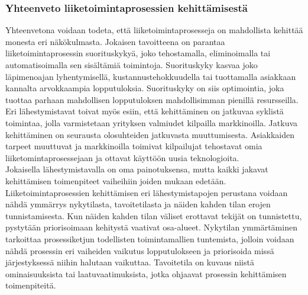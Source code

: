\documentclass[finnish,12pt,a4paper,pdftex]{article}
\begin{document}


\subsubsection{Yhteenveto liiketoimintaprosessien kehittämisestä}


Yhteenvetona voidaan todeta, että liiketoimintaprosesseja on mahdollista kehittää monesta eri näkökulmasta. Jokaisen tavoitteena on parantaa liiketoimintaprosessin suorituskykyä, joko tehostamalla, eliminoimalla tai automatisoimalla sen sisältämiä toimintoja. Suorituskyky kasvaa joko läpimenoajan lyhentymisellä, kustannustehokkuudella tai tuottamalla asiakkaan kannalta arvokkaampia lopputuloksia. Suorituskyky on siis optimointia, joka tuottaa parhaan mahdollisen lopputuloksen mahdollisimman pienillä resursseilla. \\

Eri lähestymistavat toivat myös esiin, että kehittäminen on jatkuvaa syklistä toimintaa, jolla varmistetaan yrityksen valmiudet kilpailla markkinoilla. Jatkuva kehittäminen on seurausta olosuhteiden jatkuvasta muuttumisesta. Asiakkaiden tarpeet muuttuvat ja markkinoilla toimivat kilpailujat tehostavat omia liiketomintaprosessejaan ja ottavat käyttöön uusia teknologioita.\\

\noindent Jokaisella lähestymistavalla on oma painotuksensa, mutta kaikki jakavat kehittämisen toimenpiteet vaiheihiin joiden mukaan edetään. Liiketoimintaprosessien kehittämisen eri lähestymistapojen perustana voidaan nähdä ymmärrys nykytilasta, tavoitetilasta ja näiden kahden tilan erojen tunnistamisesta. Kun näiden kahden tilan väliset erottavat tekijät on tunnistettu, pystytään priorisoimaan kehitystä vaativat osa-alueet. Nykytilan ymmärtäminen tarkoittaa prosessiketjun todellisten toimintamallien tuntemista, jolloin voidaan nähdä prosessin eri vaiheiden vaikutus lopputulokseen ja priorisoida missä järjestyksessä niihin halutaan vaikuttaa. Tavoitetila on kuvaus niistä ominaisuuksista tai laatuvaatimuksista, jotka ohjaavat prosessin kehittämisen toimenpiteitä.\\
\end{document}
